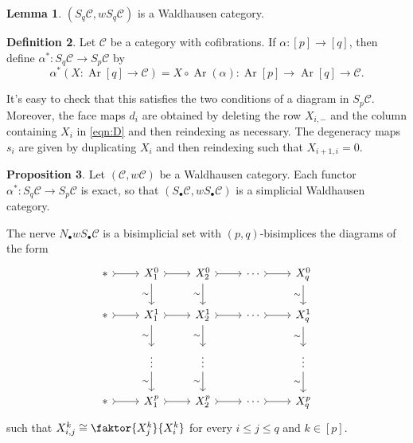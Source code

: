 \documentclass[10pt,letterpaper,cm]{nupset}
\theoremstyle{definition}
\newtheorem{definition}{Definition}
\theoremstyle{theorem}
\newtheorem{lemma}[definition]{Lemma}
\newtheorem{prop}[definition]{Proposition}
\theoremstyle{remark}
\newcommand{\1}{\mathbf{1}}
\renewcommand{\c}{\mathscr{C}}
\newcommand{\0}{\vec 0}
\DeclareMathOperator{\Ar}{Ar}
\begin{document}
\begin{lemma}
$\left(S_q \c, wS_q \c\right)$ is a Waldhausen category. 
\end{lemma}

\begin{definition}
Let $\c$ be a category with cofibrations. If $\alpha : [p] \to [q]$, then define $\alpha^{\ast} : S_q \c \to S_p \c$ by
$$\alpha^{\ast}(X: \Ar[q] \to \c) = X \circ \Ar(\alpha) : \Ar[p] \to \Ar[q] \to \c.$$
\end{definition}

It's easy to check that this satisfies the two conditions of a diagram in $S_p \c$.
Moreover, the face maps $d_i$ are obtained by deleting the row $X_{i, -}$ and the column containing $X_i$ in \eqref{eqn:D} and then reindexing as necessary. The degeneracy maps $s_i$ are given by duplicating $X_i$ and then reindexing such that $X_{i+1, i} =0$.

\begin{prop}
Let $\left(\c, w{\c}\right)$ be a Waldhausen category. Each functor $\alpha^{\ast}: S_q \c \to S_p \c$ is exact, so that $\left(S_{\bullet}\c, wS_{\bullet} \c\right)$ is a simplicial Waldhausen category.
\end{prop}	


The nerve $N_{\bullet}w S_{\bullet}\c$ is a bisimplicial set with $(p,q)$-bisimplices the diagrams of the form
\[
\begin{tikzcd}
\ast \arrow[r, tail] & X_1^0 \arrow[d, "\sim"'] \arrow[r, tail] & X_2^0 \arrow[r, tail] \arrow[d, "\sim"'] & \cdots \arrow[r, tail] & X_q^0 \arrow[d, "\sim"'] \\
\ast \arrow[r, tail] & X_1^1 \arrow[d, "\sim"'] \arrow[r, tail] & X_2^1 \arrow[r, tail] \arrow[d, "\sim"'] & \cdots \arrow[r, tail] & X_q^1 \arrow[d, "\sim"'] \\
 & \vdots \arrow[d, "\sim"'] & \vdots \arrow[d, "\sim"'] &  & \vdots \arrow[d, "\sim"'] \\
\ast \arrow[r, tail] & X_1^p \arrow[r, tail] & X_2^p \arrow[r, tail] & \cdots \arrow[r, tail] & X_q^p
\end{tikzcd}
\]
such that $X^k_{i,j} \cong \faktor{X_j^k}{X_i^k}$ for every $i\leq j\leq q$ and $k\in \left[p\right]$. 
\end{document}
